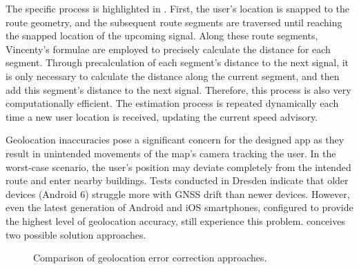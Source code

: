 The specific process is highlighted in . First, the user's location is snapped to the route geometry, and the subsequent route segments are traversed until reaching the snapped location of the upcoming signal. Along these route segments, Vincenty's formulae are employed to precisely calculate the distance for each segment. Through precalculation of each segment's distance to the next signal, it is only necessary to calculate the distance along the current segment, and then add this segment's distance to the next signal. Therefore, this process is also very computationally efficient. The estimation process is repeated dynamically each time a new user location is received, updating the current speed advisory.

Geolocation inaccuracies pose a significant concern for the designed app as they result in unintended movements of the map's camera tracking the user. In the worst-case scenario, the user's position may deviate completely from the intended route and enter nearby buildings. Tests conducted in Dresden indicate that older devices (Android 6) struggle more with GNSS drift than newer devices. However, even the latest generation of Android and iOS smartphones, configured to provide the highest level of geolocation accuracy, still experience this problem.  conceives two possible solution approaches.

\begin{figure}[htbp]
\centering
{}
\caption{Comparison of geolocation error correction approaches.}
\label{fig:battery-efficient-gps-error-correction}
\end{figure}

